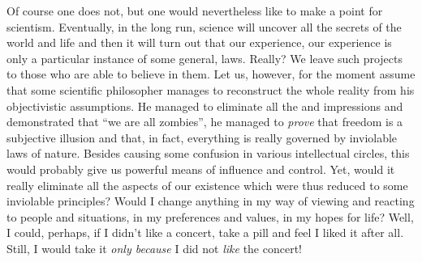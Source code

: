 
Of course one does not, but one would nevertheless like to make a point for scientism.
Eventually, in the long run, science will uncover all the secrets of the world
and life and then it will turn out that our experience, our 
experience is only a particular instance of some general,  laws.
Really? We leave such projects to those who are able to believe in them.  Let
us, however, for the moment assume that some scientific philosopher manages to
reconstruct the whole reality from his objectivistic assumptions. He managed to
eliminate all the  and impressions and demonstrated that ``we are all
zombies'', he managed to {\em prove} that freedom is a subjective illusion and
that, in fact, everything is really governed by inviolable laws of nature.
Besides causing some confusion in various intellectual circles, this would probably
give us powerful means of influence and control. Yet, would it really eliminate
all the aspects of our existence which were thus reduced to some inviolable
principles? Would I change anything in my way of viewing and reacting to people
and situations, in my preferences and values, in my hopes for life? Well, I
could, perhaps, if I didn't like a concert, take a pill and feel I liked it
after all. Still, I would take it {\em only because} I did not {\em like} the concert!

